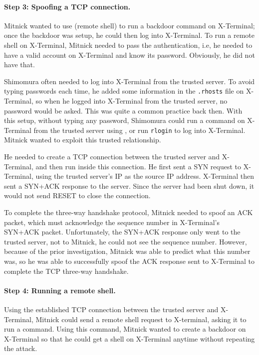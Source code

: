 \paragraph{Step 3: Spoofing a TCP connection.} Mitnick wanted to 
use \rsh (remote shell) to run a backdoor command on X-Terminal; once the 
backdoor was setup, he could then log into X-Terminal. 
To run a remote shell on X-Terminal, Mitnick needed to pass the 
authentication, i.e, he needed to have a valid account on X-Terminal and know
its password. Obviously, he did not have that.

Shimomura often needed to log into X-Terminal from the trusted server. To 
avoid typing passwords each time, he added some information
in the \texttt{.rhosts} file on X-Terminal, so when he logged into
X-Terminal from the trusted server, no password would be asked. This was quite a 
common practice back then. With this setup,
without typing any password, 
Shimomura could run a command on X-Terminal from the trusted server using 
\rsh, or run \texttt{rlogin} to log into X-Terminal. 
Mitnick wanted to exploit this trusted relationship.


He needed to create a TCP connection between the trusted server and
X-Terminal, and then run \rsh inside this connection.   
He first sent a SYN request to X-Terminal, using the trusted server's IP as the source IP address.
X-Terminal then sent a SYN+ACK response to the server. Since the server had been shut
down, it would not send RESET to close the connection. 

To complete the three-way handshake protocol, Mitnick needed to spoof
an ACK packet, which must acknowledge the sequence number in 
X-Terminal's SYN+ACK packet. Unfortunately, 
the SYN+ACK response only went to the trusted server, not to Mitnick,
he could not see the sequence number. However, 
because of the prior investigation, Mitnick was able to
predict what this number was, so he was able to 
successfully spoof the ACK response sent to X-Terminal to complete the TCP three-way
handshake. 


\paragraph{Step 4: Running a remote shell.} 
Using the established TCP connection between the trusted server and X-Terminal, Mitnick
could send a remote shell request to X-terminal, asking 
it to run a command. Using this command, 
Mitnick wanted to create a
backdoor on X-Terminal so that he could get a shell 
on X-Terminal anytime without repeating the attack. 


